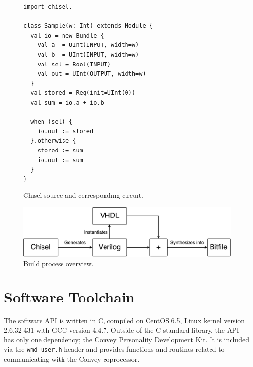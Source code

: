 \begin{figure}
\begin{mintedsubfloat}{0.5\linewidth}
\begin{verbatim}
import chisel._

class Sample(w: Int) extends Module {
  val io = new Bundle {
    val a  = UInt(INPUT, width=w)
    val b  = UInt(INPUT, width=w)
    val sel = Bool(INPUT)
    val out = UInt(OUTPUT, width=w)
  }
  val stored = Reg(init=UInt(0))
  val sum = io.a + io.b

  when (sel) {
    io.out := stored
  }.otherwise {
    stored := sum
    io.out := sum
  }
} 
\end{verbatim} 
\end{mintedsubfloat}
\caption{Chisel source and corresponding circuit.}
\label{fig:chisel-sample}
\end{figure}

\begin{figure}[ht]
  \centering
  \includegraphics[width=0.8\linewidth]{fig/hardware-build-process}
  \caption{Build process overview.\label{fig:hw-build-process} }
\end{figure}

\section{Software Toolchain}
\label{sec:sw-toolchain}

The software API is written in C, compiled on CentOS 6.5, Linux kernel version
2.6.32-431 with GCC version 4.4.7. Outside of the C standard library, the API
has only one dependency; the Convey Personality Development Kit. It is included
via the \texttt{wmd\_user.h} header and provides functions and routines related
to communicating with the Convey coprocessor.


\cleardoublepage
